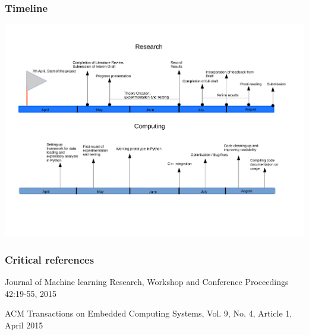 \documentclass[pdf]{beamer}
\begin{document}
\begin{frame}
\frametitle{Timeline}
\hspace*{-6mm}
\includegraphics[scale=0.41]{timeline.pdf}
\end{frame}

\begin{frame}
\frametitle{Critical references}

\begin{thebibliography}{t}
Journal of Machine learning Research, Workshop and Conference Proceedings 42:19-55, 2015

ACM Transactions on Embedded Computing Systems, Vol. 9, No. 4, Article 1, April 2015

\end{thebibliography}
\end{frame}
\end{document}
